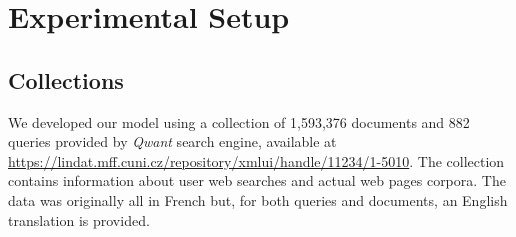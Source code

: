 \newpage
\enlargethispage{3\baselineskip}
\section{Experimental Setup}
\label{sec:setup}

\subsection{Collections}
We developed our model using a collection of 1,593,376 documents and 882 queries provided by \textit{Qwant} search engine, available at \url{https://lindat.mff.cuni.cz/repository/xmlui/handle/11234/1-5010}.
\newline
The collection contains information about user web searches and actual web pages corpora. The data was originally all in French but, for both queries and documents, an English translation is provided.


